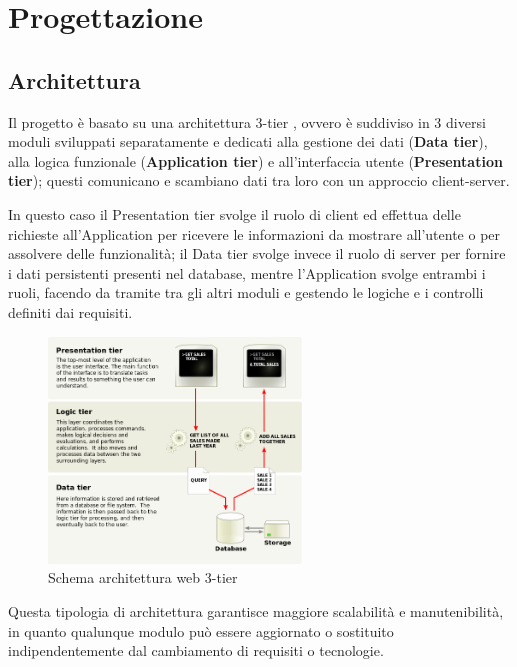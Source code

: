 
\chapter{Progettazione}


\section{Architettura}
Il progetto è basato su una architettura 3-tier \cite{wiki:3-tier-architecture},
ovvero è suddiviso in 3 diversi moduli sviluppati separatamente e dedicati alla
gestione dei dati (\textbf{Data tier}), alla logica funzionale (\textbf{Application tier})
e all'interfaccia utente (\textbf{Presentation tier}); questi comunicano e
scambiano dati tra loro con un approccio client-server.

In questo caso il Presentation tier svolge il ruolo di client ed effettua delle
richieste all'Application per ricevere le informazioni da mostrare all'utente
o per  assolvere delle funzionalità; il Data tier svolge invece il ruolo di server
per fornire i dati persistenti presenti nel database, mentre l'Application svolge
entrambi i ruoli, facendo da tramite tra gli altri moduli e gestendo le logiche
e i controlli definiti dai requisiti.

\begin{figure}[ht]
	\centering
	\includegraphics[width=0.6\textwidth]{assets/diagrams/3-tier-architecture.png}
	\caption{Schema architettura web 3-tier}
	\label{fig:3-tier-architecture}
\end{figure}

Questa tipologia di architettura garantisce maggiore scalabilità e manutenibilità,
in quanto qualunque modulo può essere aggiornato o sostituito indipendentemente
dal cambiamento di requisiti o tecnologie.


